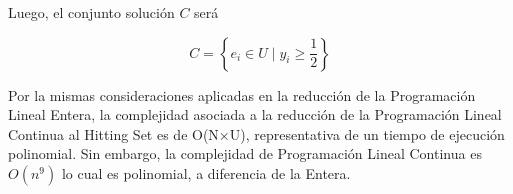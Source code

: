 Luego, el conjunto solución $C$ será

\[
    C = \left\{e_i \in U \mid y_{i} \geq \frac{1}{2}\right\}
\]

Por la mismas consideraciones aplicadas en la reducción de la Programación Lineal Entera, la complejidad asociada a la reducción de la Programación Lineal Continua al Hitting Set es de O(N×U), representativa de un tiempo de ejecución polinomial.
Sin embargo, la complejidad de Programación Lineal Continua es $O(n^9)$ lo cual es polinomial, a diferencia de la Entera. 


